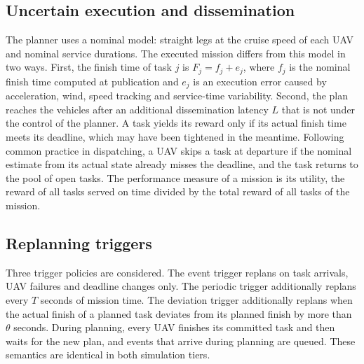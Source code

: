 \subsection{Uncertain execution and dissemination}\label{sec:uncertainty}
The planner uses a nominal model: straight legs at the cruise speed of each UAV and nominal service durations. The
executed mission differs from this model in two ways. First, the finish time of task $j$ is $F_j=f_j+e_j$, where $f_j$
is the nominal finish time computed at publication and $e_j$ is an execution error caused by acceleration, wind,
speed tracking and service-time variability. Second, the plan reaches the vehicles after an additional dissemination
latency $L$ that is not under the control of the planner. A task yields its reward only if its actual finish time meets
its deadline, which may have been tightened in the meantime. Following common practice in dispatching, a UAV skips a
task at departure if the nominal estimate from its actual state already misses the deadline, and the task returns to
the pool of open tasks. The performance measure of a mission is its utility, the reward of all tasks served on time
divided by the total reward of all tasks of the mission.

\subsection{Replanning triggers}\label{sec:triggers}
Three trigger policies are considered. The event trigger replans on task arrivals, UAV failures and deadline changes
only. The periodic trigger additionally replans every $T$ seconds of mission time. The deviation trigger additionally
replans when the actual finish of a planned task deviates from its planned finish by more than $\theta$ seconds. During
planning, every UAV finishes its committed task and then waits for the new plan, and events that arrive during planning
are queued. These semantics are identical in both simulation tiers.
